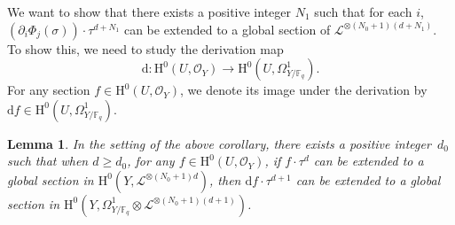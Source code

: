 \documentclass[11pt]{article}
\numberwithin{equation}{section}
\theoremstyle{plain}
\newtheorem{lem}[thm]{Lemma}
\theoremstyle{definition}
\newcommand{\ho}{\mathrm{H}}
\newcommand{\li}{\mathcal{L}}
\newcommand{\F}{\mathbb{F}}
\begin{document}
We want to show that there exists a positive integer $N_1$ such that for each $i$, $\left(\partial_i \Phi_j(\sigma) \right)\cdot \tau^{d+N_1}$ can be extended to a global section of $\li^{\otimes (N_0+1)(d+N_1)}$. To show this, we need to study the derivation map\vspace*{-3pt}
\[
\mathrm{d}: \ho^0(U, \mathcal{O}_Y)\to \ho^0(U, \Omega_{Y/\F_q}^1).
\]
For any section $f\in \ho^0(U, \mathcal{O}_Y)$, we denote its image under the derivation by $\mathrm{d}f\in \ho^0(U, \Omega_{Y/\F_q}^1)$.
\begin{lem}\label{preextend}
In the setting of the above corollary, there exists a positive integer~$d_0$ such that when $d\geq d_0$, for any $f\in \ho^0(U, \mathcal{O}_Y)$, if $f\cdot \tau^d$ can be extended to a global section in $ \ho^0(Y, \li^{\otimes (N_0+1)d})$, then $\mathrm{d} f\cdot \tau^{d+1}$ can be extended to a global section in $\ho^0(Y, \Omega_{Y/\F_q}^1\otimes \li^{\otimes (N_0+1)(d+1)})$.
\end{lem}
\end{document}
